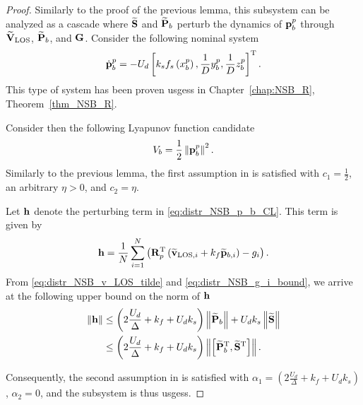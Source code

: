 \begin{proof}
    Similarly to the proof of the previous lemma, this subsystem can be analyzed as a cascade where ${\widetilde{\mathbf{S}}}$ and ${\widetilde{\mathbf{P}}}_{b}$ perturb the dynamics of $\mathbf{p}_b^p$ through $\widetilde{\mathbf{V}}_{\rm LOS}$, ${\widetilde{\mathbf{P}}}_{b}$, and $\mathbf{G}$.
    Consider the following nominal system
    \begin{equation}
        \dot{\mathbf{p}}_b^p = - U_d \left[k_s f_s\left(x_b^p\right), \frac{1}{D} y_b^p, \frac{1}{D} z_b^p\right]^{\mathrm{T}}.
        \label{eq:distr_NSB_p_b_nominal}
    \end{equation}
    This type of system has been proven \glspl{usges} in Chapter~\ref{chap:NSB_R}, Theorem~\ref{thm_NSB_R}.

    Consider then the following Lyapunov function candidate
    \begin{equation}
        V_b = \frac{1}{2} \left\|\mathbf{p}_b^p\right\|^2.
    \end{equation}
    Similarly to the previous lemma, the first assumption in \cite[Proposition 9]{pettersen_lyapunov_2017} is satisfied with $c_1 = \frac{1}{2}$, an arbitrary $\eta > 0$, and $c_2 = \eta$.
    
    Let $\mathbf{h}$ denote the perturbing term in \eqref{eq:distr_NSB_p_b_CL}. This term is given by
    \begin{equation}
        \mathbf{h} = \frac{1}{N} \sum_{i=1}^N \left(\mathbf{R}_p^{\mathrm{T}} \left(\widetilde{\mathbf{v}}_{{\rm LOS}, i} + k_f \widetilde{\mathbf{p}}_{b, i}\right) - g_i \right).
    \end{equation}
    From \eqref{eq:distr_NSB_v_LOS_tilde} and \eqref{eq:distr_NSB_g_i_bound}, we arrive at the following upper bound on the norm of $\mathbf{h}$
    \begin{align}
        \left\|\mathbf{h}\right\| &\leq \left(2\frac{U_d}{\Delta} + k_f + U_d k_s\right) \left\|\widetilde{\mathbf{P}}_b\right\| + U_d k_s \left\|\widetilde{\mathbf{S}}\right\| \nonumber \\
        &\leq \left(2\frac{U_d}{\Delta} + k_f + U_d k_s\right) \left\|\left[\widetilde{\mathbf{P}}_b^{\mathrm{T}}, \widetilde{\mathbf{S}}^{\mathrm{T}}\right]\right\|.
    \end{align}
    
    Consequently, the second assumption in \cite[Proposition 9]{pettersen_lyapunov_2017} is satisfied with $\alpha_1 = \left(2\frac{U_d}{\Delta} + k_f + U_d k_s\right)$, $\alpha_2 = 0$, and the subsystem is thus \glspl{usges}.
\end{proof}

